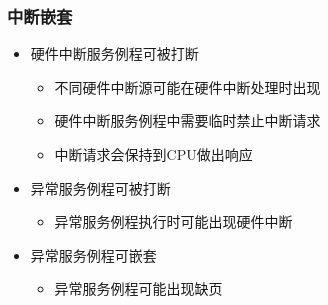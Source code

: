 \begin{frame}
	\frametitle{中断嵌套}
    \begin{itemize}
        \item 硬件中断服务例程可被打断
	    \begin{itemize}
        	\item 不同硬件中断源可能在硬件中断处理时出现
        	\item 硬件中断服务例程中需要临时禁止中断请求
        	\item 中断请求会保持到CPU做出响应
    	\end{itemize}
        \item 异常服务例程可被打断
	    \begin{itemize}
        	\item 异常服务例程执行时可能出现硬件中断
    	\end{itemize}

        \item 异常服务例程可嵌套
	    \begin{itemize}
        	\item 异常服务例程可能出现缺页
    	\end{itemize}
    \end{itemize}
\end{frame}


